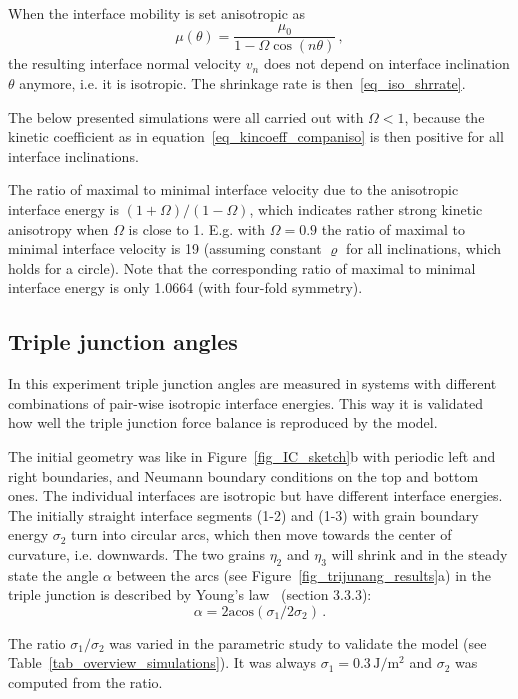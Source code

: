 When the interface mobility is set anisotropic as
\begin{equation} \label{eq_kincoeff_companiso}
	\mu(\theta) = \frac{\mu_0}{1-\Omega\cos(n\theta)} \,,
\end{equation}
the resulting interface normal velocity $v_n$ does not depend on interface inclination $\theta$ anymore, i.e. it is isotropic. The shrinkage rate is then~\eqref{eq_iso_shrrate}.

The below presented simulations were all carried out with $\Omega<1$, because the kinetic coefficient as in equation~\eqref{eq_kincoeff_companiso} is then positive for all interface inclinations. 

The ratio of maximal to minimal interface velocity due to the anisotropic interface energy is $(1+\Omega)/(1-\Omega)$, which indicates rather strong kinetic anisotropy when $\Omega$ is close to 1. E.g. with $\Omega=0.9$ the ratio of maximal to minimal interface velocity is 19 (assuming constant $\varrho$ for all inclinations, which holds for a circle). Note that the corresponding ratio of maximal to minimal interface energy is only 1.0664 (with four-fold symmetry).

\subsection{Triple junction angles}

In this experiment triple junction angles are measured in systems with different combinations of pair-wise isotropic interface energies. This way it is validated how well the triple junction force balance is reproduced by the model.

The initial geometry was like in Figure~\ref{fig_IC_sketch}b with periodic left and right boundaries, and Neumann boundary conditions on the top and bottom ones. The individual interfaces are isotropic but have different interface energies. The initially straight interface segments (1-2) and (1-3) with grain boundary energy $\sigma_2$ turn into circular arcs, which then move towards the center of curvature, i.e. downwards. The two grains $\eta_2$ and $\eta_3$ will shrink and in the steady state the angle $\alpha$ between the arcs (see Figure~\ref{fig_trijunang_results}a) in the triple junction is described by Young's law~\cite{Porter2009} (section 3.3.3):
\begin{equation}
	\alpha = 2\mathrm{acos}(\sigma_{1}/2\sigma_{2}) \,.
\end{equation}

The ratio $\sigma_1/\sigma_2$ was varied in the parametric study to validate the model (see Table~\ref{tab_overview_simulations}). It was always $\sigma_1=0.3\,\mathrm{J/m^2}$ and $\sigma_2$ was computed from the ratio.

